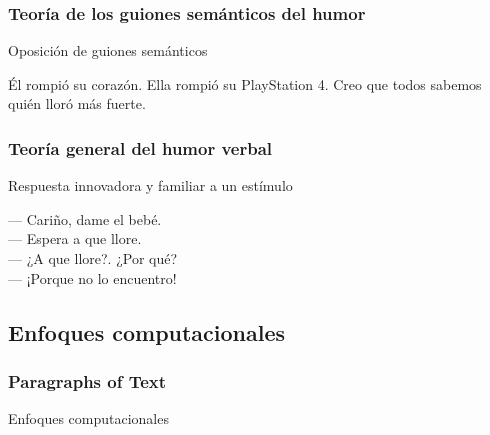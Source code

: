 \begin{frame}
\frametitle{Teoría de los guiones semánticos del humor}
	Oposición de guiones semánticos
	\begin{example}
		Él rompió su corazón. Ella rompió su PlayStation 4. Creo que todos sabemos quién lloró más fuerte.
	\end{example}
\end{frame}

\begin{frame}
\frametitle{Teoría general del humor verbal}
	Respuesta innovadora y familiar a un estímulo
	\begin{example}
		— Cariño, dame el bebé.\\
		— Espera a que llore.\\
		— ¿A que llore?. ¿Por qué?\\
		— ¡Porque no lo encuentro!\\
	\end{example}
\end{frame}

\subsection{Enfoques computacionales}
\begin{frame}
\frametitle{Paragraphs of Text}
Enfoques computacionales
\end{frame}
